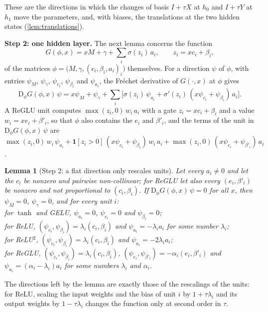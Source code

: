 \documentclass[10pt]{article}
\newtheorem{lemma}[theorem]{Lemma}
\theoremstyle{definition}
\theoremstyle{remark}
\newcommand{\Der}{\mathrm{D}}
\newcommand{\para}[1]{\smallskip\noindent\textbf{#1}\hspace{0.5em}}
\begin{document}
These are the directions in which the changes of basis $I + \tau X$ at $h_0$ and $I + \tau Y$ at $h_1$ move the parameters, and, with biases, the translations at the two hidden states (\cref{lem:translations}).

\para{Step 2: one hidden layer.} The next lemma concerns the function
\[
G(\phi, x) = xM + \gamma + \textstyle\sum_i \sigma(z_i)\,a_i,\qquad z_i = xc_i + \beta_i,
\]
of the matrices $\phi = \big(M, \gamma, (c_i, \beta_i, a_i)_i\big)$ themselves. For a direction $\psi$ of $\phi$, with entries $\psi_M$, $\psi_\gamma$, $\psi_{c_i}$, $\psi_{\beta_i}$ and $\psi_{a_i}$, the Fr\'echet derivative of $G(\cdot, x)$ at $\phi$ gives
\begin{equation}\label{eq:dotF}
\Der_\phi G(\phi, x)\,\psi = x\psi_M + \psi_\gamma + \sum_i \big[\sigma(z_i)\,\psi_{a_i} + \sigma'(z_i)\,(x\psi_{c_i} + \psi_{\beta_i})\,a_i\big].
\end{equation}
A ReGLU unit computes $\max(z_i, 0)\,w_i\,a_i$ with a gate $z_i = xc_i + \beta_i$ and a value $w_i = xe_i + \beta'_i$, so that $\phi$ also contains the $e_i$ and $\beta'_i$, and the terms of the unit in $\Der_\phi G(\phi, x)\,\psi$ are $\max(z_i, 0)\,w_i\,\psi_{a_i} + \mathbf 1[z_i > 0]\,(x\psi_{c_i} + \psi_{\beta_i})\,w_i\,a_i + \max(z_i, 0)\,(x\psi_{e_i} + \psi_{\beta'_i})\,a_i$.

\begin{lemma}[Step 2: a flat direction only rescales units]\label{lem:unitid}
Let every $a_i \neq 0$ and let the $c_i$ be nonzero and pairwise non-collinear; for ReGLU let also every $(e_i, \beta'_i)$ be nonzero and not proportional to $(c_i, \beta_i)$. If $\Der_\phi G(\phi, x)\,\psi = 0$ for all $x$, then $\psi_M = 0$, $\psi_\gamma = 0$, and for every unit $i$:\\
for $\tanh$ and GELU, $\psi_{a_i} = 0$, $\psi_{c_i} = 0$ and $\psi_{\beta_i} = 0$;\\
for ReLU, $(\psi_{c_i}, \psi_{\beta_i}) = \lambda_i(c_i, \beta_i)$ and $\psi_{a_i} = -\lambda_ia_i$ for some number $\lambda_i$;\\
for ReLU$^2$, $(\psi_{c_i}, \psi_{\beta_i}) = \lambda_i(c_i, \beta_i)$ and $\psi_{a_i} = -2\lambda_ia_i$;\\
for ReGLU, $(\psi_{c_i}, \psi_{\beta_i}) = \lambda_i(c_i, \beta_i)$, $(\psi_{e_i}, \psi_{\beta'_i}) = -\alpha_i(e_i, \beta'_i)$ and $\psi_{a_i} = (\alpha_i - \lambda_i)a_i$ for some numbers $\lambda_i$ and $\alpha_i$.
\end{lemma}

The directions left by the lemma are exactly those of the rescalings of the units: for ReLU, scaling the input weights and the bias of unit $i$ by $1 + \tau\lambda_i$ and its output weights by $1 - \tau\lambda_i$ changes the function only at second order in $\tau$.
\end{document}
